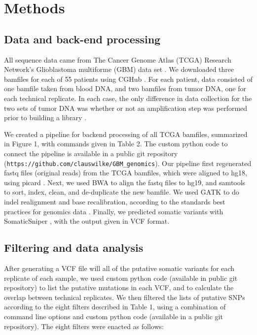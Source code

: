 \documentclass[11pt]{article} %
\begin{document}
\section*{Methods}

\subsection*{Data and back-end processing}

All sequence data came from The Cancer Genome Atlas (TCGA) Research Network's Glioblastoma multiforme (GBM) data set \citep{TCGA-GBM}. We downloaded three bamfiles for each of 55 patients using CGHub \citep{CGHub}. For each patient, data consisted of one bamfile taken from blood DNA, and two bamfiles from tumor DNA, one for each technical replicate. In each case, the only difference in data collection for the two sets of tumor DNA was whether or not an amplification step was performed prior to building a library \citep{TCGA-GBM}. 

We created a pipeline for backend processing of all TCGA bamfiles, summarized in Figure 1, with commands given in Table 2. The custom python code to connect the pipeline is available in a public 
git repository (\texttt{https://github.com/clauswilke/GBM\_genomics}). Our pipeline first regenerated fastq files (original reads) from the TCGA bamfiles, which were aligned to hg18, using picard \citep{picard}. Next, we used BWA \citep{bwa} to align the fastq files to hg19, and samtools \citep{SAMtools}to sort, index, clean, and de-duplicate the new bamfile. We used GATK \citep{GATK} to do indel realignment and base recalibration, according to the standards best practices for genomics data \citep{best-practices}. Finally, we predicted somatic variants with SomaticSniper \citep{SomaticSniper}, with the output given in VCF format.

\subsection*{Filtering and data analysis}

After generating a VCF file will all of the putative somatic variants for each replicate of each sample, we used custom python code (available in public git repository) to list the putative mutations in each VCF, and to calculate the overlap between technical replicates. We then filtered the lists of putative SNPs according to the eight filters described in Table 1, using a combination of command line options and custom python code (available in a public git repository). The eight filters were enacted as follows: 
\end{document}
